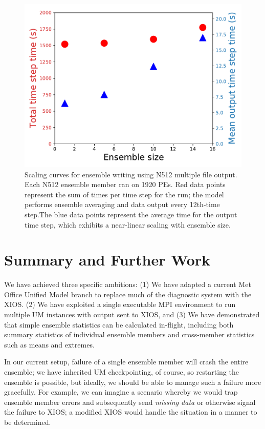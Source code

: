 \documentclass[twocolumn, 5p, times]{elsarticle}
\begin{document}
\begin{figure}
	\includegraphics[width=\columnwidth]{figures/ens-n512.pdf}
	\caption{Scaling curves for ensemble writing using N512 multiple file output. Each N512 ensemble member ran on 1920 PEs. Red data points represent the sum of times per time step for the run; the model performs ensemble averaging and data output every 12th-time step.The blue data points represent the average time for the output time step, which exhibits a near-linear scaling with ensemble size.}
        \label{first-ensemble-runs-n512}
\end{figure}



\section{Summary and Further Work}
\label{summary}

We have achieved three specific ambitions: (1) We have adapted a current Met Office Unified Model branch to replace much of the diagnostic system with the XIOS.
(2) We have exploited a single executable MPI environment to run multiple UM instances with output sent to XIOS, and (3) We have demonstrated that simple ensemble statistics can be calculated in-flight, including both summary statistics of individual ensemble members and cross-member statistics such as means and extremes.

In our current setup, failure of a single ensemble member will crash the entire ensemble; we have inherited UM checkpointing, of course, so restarting the ensemble is possible, but ideally, we should be able to manage such a failure more gracefully. For example, we can imagine a scenario whereby we would trap ensemble member errors and subsequently send \textit{missing data} or otherwise signal the failure to XIOS; a modified XIOS would handle the situation in a manner to be determined. 
\end{document}
